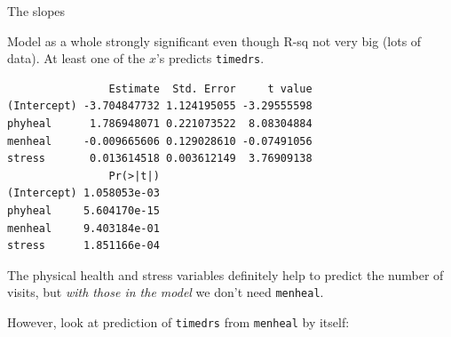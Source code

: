 \begin{frame}[fragile]{The slopes}

Model as a whole strongly significant even though R-sq not very big (lots of data). At least one of the $x$'s predicts \verb-timedrs-.

\begin{footnotesize}
\begin{knitrout}
\color{fgcolor}\begin{kframe}
\begin{alltt}
\hlopt{$}
\end{alltt}
\begin{verbatim}
                Estimate  Std. Error     t value
(Intercept) -3.704847732 1.124195055 -3.29555598
phyheal      1.786948071 0.221073522  8.08304884
menheal     -0.009665606 0.129028610 -0.07491056
stress       0.013614518 0.003612149  3.76909138
                Pr(>|t|)
(Intercept) 1.058053e-03
phyheal     5.604170e-15
menheal     9.403184e-01
stress      1.851166e-04
\end{verbatim}
\end{kframe}
\end{knitrout}
  
\end{footnotesize}

The physical health and stress variables definitely help to predict the number of visits, but {\em with those in the model} we don't need \verb-menheal-.


However, look at prediction of \verb-timedrs- from \verb-menheal- by itself:
  
\end{frame}

